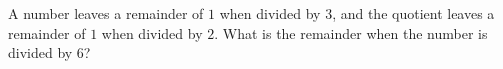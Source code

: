 A number leaves a remainder of $1$ when divided by $3$, and the quotient leaves a remainder of $1$ when divided by $2$. What is the remainder when the number is divided by $6$?
